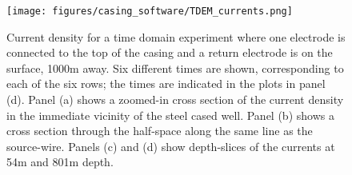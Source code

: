 \begin{figure}
    \begin{center}
    \texttt{[image: figures/casing\_software/TDEM\_currents.png]}
    \end{center}
\caption{
    Current density for a time domain experiment where one electrode is connected to the top of the casing and a return electrode is on the surface, 1000m away.
    Six different times are shown, corresponding to each of the six rows; the times are indicated in the plots in panel (d).
    Panel (a) shows a zoomed-in cross section of the current density in the immediate vicinity of the steel cased well.
    Panel (b) shows a cross section through the half-space along the same line as the source-wire.
    Panels (c) and (d) show depth-slices of the currents at 54m and 801m depth.
}
\label{fig:TDEM_currents}
\end{figure}
